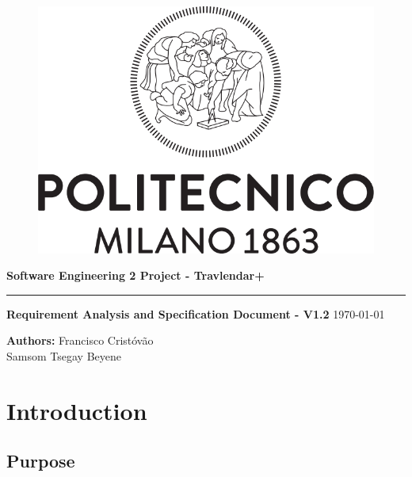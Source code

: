 \documentclass[12pt]{article}
\begin{document}
\begin{titlepage}
    \begin{center}
    \begin{figure}
        \centering
        \includegraphics[scale=0.2]{logoPolimi.png}
        \vspace{1.5cm}
    \end{figure}

    \Huge\textbf{Software Engineering 2 Project - Travlendar+}
    \rule{12cm}{0.5pt}
    \Huge\textbf{Requirement Analysis and Specification Document - V1.2}
    \today
    \end{center}
    
    \vspace{3cm}
    
    \begin{flushleft}
        \LARGE\textbf{Authors: }
        \newline\newline
        \Large\texttt{}{Francisco Cristóvão \\ Samsom Tsegay Beyene}
    \end{flushleft}



\end{titlepage}

\newpage
  \tableofcontents
\newpage

\section{Introduction}

\subsection{Purpose}
\end{document}

